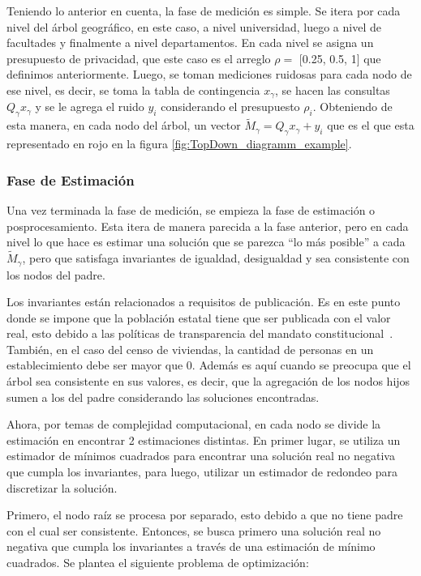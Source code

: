 \documentclass[informe]{upropuesta}
\begin{document}
Teniendo lo anterior en cuenta, la fase de medición es simple. Se itera por cada nivel del árbol geográfico, en este caso, a nivel universidad, luego a nivel de facultades y finalmente a nivel departamentos. En cada nivel se asigna un presupuesto de privacidad, que este caso es el arreglo $\rho =$ [0.25, 0.5, 1] que definimos anteriormente. Luego, se toman mediciones ruidosas para cada nodo de ese nivel, es decir, se toma la tabla de contingencia $x_{\gamma}$, se hacen las consultas $Q_{\gamma}x_{\gamma}$ y se le agrega el ruido $y_{i}$ considerando el presupuesto $\rho_i$. Obteniendo de esta manera, en cada nodo del árbol, un vector $\widetilde{M}_{\gamma} = Q_{\gamma}x_{\gamma} + y_i$ que es el que esta representado en rojo en la figura \ref{fig:TopDown_diagramm_example}.

\subsubsection*{Fase de Estimación}

Una vez terminada la fase de medición, se empieza la fase de estimación o posprocesamiento. Esta itera de manera parecida a la fase anterior, pero en cada nivel lo que hace es estimar una solución que se parezca “lo más posible” a cada $\widetilde{M}_{\gamma}$, pero que satisfaga invariantes de igualdad, desigualdad y sea consistente con los nodos del padre. 

Los invariantes están relacionados a requisitos de publicación. Es en este punto donde se impone que la población estatal tiene que ser publicada con el valor real, esto debido a las políticas de transparencia del mandato constitucional~\cite{Abowd2022}. También, en el caso del censo de viviendas, la cantidad de personas en un establecimiento debe ser mayor que 0. Además es aquí cuando se preocupa que el árbol sea consistente en sus valores, es decir, que la agregación de los nodos hijos sumen a los del padre considerando las soluciones encontradas.

Ahora, por temas de complejidad computacional, en cada nodo se divide la estimación en encontrar 2 estimaciones distintas. En primer lugar, se utiliza un estimador de mínimos cuadrados para encontrar una solución real no negativa que cumpla los invariantes, para luego, utilizar un estimador de redondeo para discretizar la solución. 

Primero, el nodo raíz se procesa por separado, esto debido a que no tiene padre con el cual ser consistente. Entonces, se busca primero una solución real no negativa que cumpla los invariantes a través de una estimación de mínimo cuadrados. Se plantea el siguiente problema de optimización:
\end{document}
